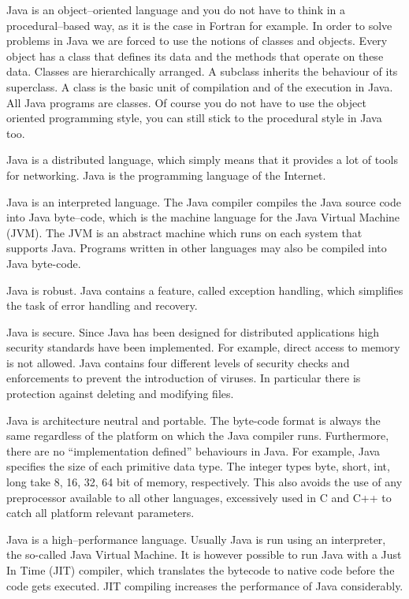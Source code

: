 Java is an object--oriented language and you do not have to think in a 
procedural--based way, as it is the case in Fortran for example. In order to 
solve problems in Java we are forced to use the notions of classes and objects. 
Every object has a class that defines its data and the methods that operate 
on these data. Classes are hierarchically arranged. A subclass inherits the 
behaviour of its superclass. A class is the basic unit of compilation
and of the execution in Java. All Java programs are classes.
Of course you do not have to use the object oriented programming style,
you can still stick to the procedural style in Java too.

Java is a distributed language, which simply means that it provides a lot of 
tools for networking. Java is the programming language of the Internet.

Java is an interpreted language. The Java compiler compiles the Java
source code into Java byte--code, which is the machine language for the Java
Virtual Machine (JVM). The JVM is an abstract machine which runs on each system
that supports Java. Programs written in other languages 
may also be compiled into Java byte-code.

Java is robust. Java contains a feature, called 
exception handling, which simplifies the
task of error handling and recovery.

Java is secure. Since Java has been designed for distributed applications
high security standards have been implemented. For example, direct access to
memory is not allowed. Java contains four different levels of security 
checks and enforcements to prevent the introduction of viruses. 
In particular there is protection against deleting and modifying files.

Java is architecture neutral and portable. The byte-code format is always the 
same regardless of the platform on which the Java compiler runs. Furthermore,
there are no ``implementation defined'' behaviours in Java. For example, Java
specifies the size of each primitive data type. The integer 
types byte, short, int, long take 8, 16, 32, 64 bit of memory, respectively.
This also avoids the use of any preprocessor available to all other
languages, excessively used in C and C++ to catch all
platform relevant parameters.

Java is a high--performance language. 
Usually Java is run using an interpreter, the so-called  Java Virtual Machine.
It is however possible to run Java with a 
Just In Time (JIT) compiler, which translates the bytecode to native code
before the code gets executed. JIT compiling increases the performance of Java 
considerably.

